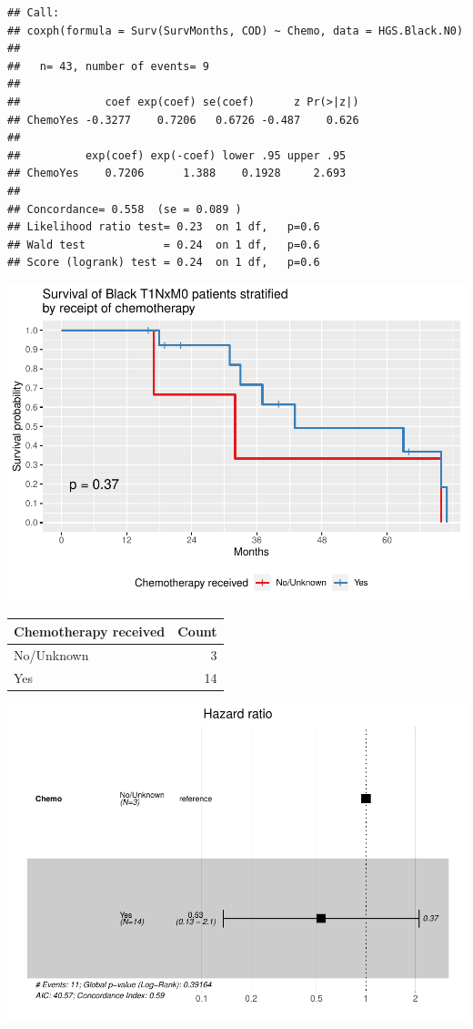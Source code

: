 \documentclass[
]{article}
\begin{document}
\begin{verbatim}
## Call:
## coxph(formula = Surv(SurvMonths, COD) ~ Chemo, data = HGS.Black.N0)
## 
##   n= 43, number of events= 9 
## 
##             coef exp(coef) se(coef)      z Pr(>|z|)
## ChemoYes -0.3277    0.7206   0.6726 -0.487    0.626
## 
##          exp(coef) exp(-coef) lower .95 upper .95
## ChemoYes    0.7206      1.388    0.1928     2.693
## 
## Concordance= 0.558  (se = 0.089 )
## Likelihood ratio test= 0.23  on 1 df,   p=0.6
## Wald test            = 0.24  on 1 df,   p=0.6
## Score (logrank) test = 0.24  on 1 df,   p=0.6
\end{verbatim}

\includegraphics{EarlyOvaryRace_files/figure-latex/unnamed-chunk-16-1.pdf}

\begin{tabular}[t]{l|r}
\hline
Chemotherapy received & Count\\
\hline
No/Unknown & 3\\
\hline
Yes & 14\\
\hline
\end{tabular}

\includegraphics{EarlyOvaryRace_files/figure-latex/unnamed-chunk-17-1.pdf}
\end{document}
